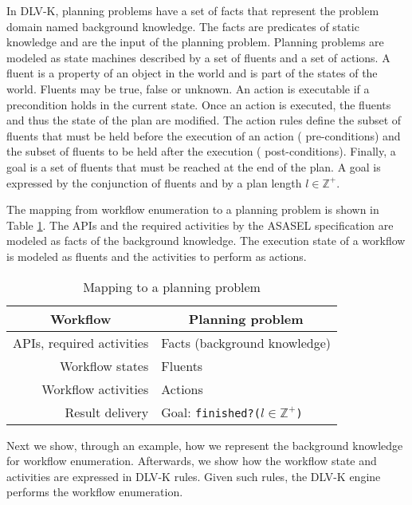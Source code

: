 In DLV-K, planning problems have a set of facts that represent the problem domain named background knowledge. The facts are predicates of static knowledge and are the input of the planning problem. Planning problems are modeled as state machines described by a set of fluents and a set of actions. A fluent is a property of an object in the world and is part of the states of the world. Fluents may be true, false or unknown. An action is executable if a precondition holds in the current state. Once an action is executed, the fluents and thus the state of the plan are modified. The action rules define the subset of fluents that must be held before the execution of an action (\ie{} pre-conditions) and the subset of fluents to be held after the execution (\ie{} post-conditions). Finally, a goal is a set of fluents that must be reached at the end of the plan. A goal is expressed by the conjunction of fluents and by a plan length $l \in \mathds{Z}^{+}$.

The mapping from workflow enumeration to a planning problem is shown in Table \ref{tab:mappingQW-PP}. The APIs and the required activities by the ASASEL specification are modeled as facts of the background knowledge. The execution state of a workflow is modeled as fluents and the activities to perform as actions.
	
	\begin{table}
	   \begin{center}
	      \begin{tabular}{|r|l|}
	         \hline
	         \multicolumn{1}{|c|}{\textbf{Workflow }}& \multicolumn{1}{c|}{\textbf{Planning problem}} \\
	         \hline
	         APIs, required activities & Facts (background knowledge) \\
	         \hline
	         Workflow states & Fluents \\
	         \hline
	         Workflow activities & Actions \\
	         \hline
	         Result delivery & Goal: \texttt{finished?(}$l \in \mathds{Z}^{+}$\texttt{)} \\
	         \hline
	      \end{tabular}
	   \end{center} 
	   \caption{Mapping to a planning problem}
	   \label{tab:mappingQW-PP}
	\end{table}
	
Next we show, through an example, how we represent the background knowledge for workflow enumeration. Afterwards, we show how the workflow state and activities are expressed in DLV-K rules. Given such rules, the DLV-K engine performs the workflow enumeration.

